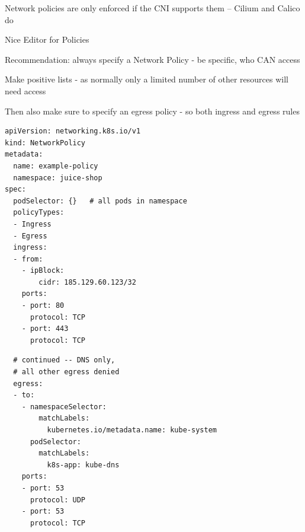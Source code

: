 \documentclass[Screen16to9,17pt]{foils}
\begin{document}
\begin{list2}
\item Network policies are only enforced if the CNI supports them -- Cilium and Calico do
\end{list2}




\begin{list2}
\item Nice Editor for Policies 
\item Recommendation: always specify a Network Policy - be specific, who CAN access
\item Make positive lists - as normally only a limited number of other resources will need access
\item Then also make sure to specify an egress policy - so both ingress and egress rules
\end{list2}



\begin{minipage}[t]{0.48\textwidth}
\begin{verbatim}
apiVersion: networking.k8s.io/v1
kind: NetworkPolicy
metadata:
  name: example-policy
  namespace: juice-shop
spec:
  podSelector: {}   # all pods in namespace
  policyTypes:
  - Ingress
  - Egress
  ingress:
  - from:
    - ipBlock:
        cidr: 185.129.60.123/32
    ports:
    - port: 80
      protocol: TCP
    - port: 443
      protocol: TCP
\end{verbatim}
\end{minipage}\hfill
\begin{minipage}[t]{0.48\textwidth}
\begin{verbatim}
  # continued -- DNS only,
  # all other egress denied
  egress:
  - to:
    - namespaceSelector:
        matchLabels:
          kubernetes.io/metadata.name: kube-system
      podSelector:
        matchLabels:
          k8s-app: kube-dns
    ports:
    - port: 53
      protocol: UDP
    - port: 53
      protocol: TCP
\end{verbatim}
\end{minipage}

{\footnotesize{}}

\end{document}
